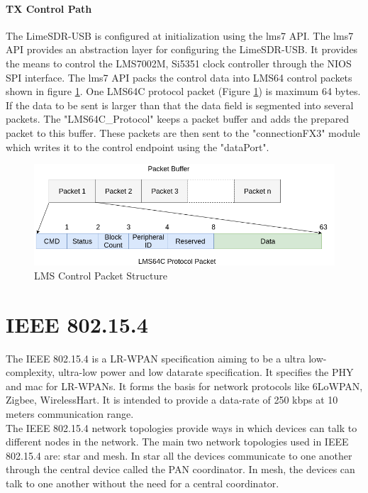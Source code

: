 \paragraph{TX Control Path} The LimeSDR-USB is configured at initialization using the lms7 \ac{API}.
The lms7 \ac{API} provides an abstraction layer for configuring the LimeSDR-USB.
It provides the means to control the LMS7002M, Si5351 clock controller through the NIOS SPI interface.
The lms7 API packs the control data into LMS64 control packets shown in figure \ref{lms_packet}.
One LMS64C protocol packet (Figure \ref{lms_packet}) is maximum 64 bytes.
If the data to be sent is larger than that the data field is segmented into several packets.
The "LMS64C\_Protocol" keeps a packet buffer and adds the prepared packet to this buffer.
These packets are then sent to the "connectionFX3" module which writes it to the control endpoint using the "dataPort".



\begin{figure}[h!]
\centering
\includegraphics[width=\textwidth]{Figure/LMS64C_Packet.png}
\caption{LMS Control Packet Structure}
\label{lms_packet}
\end{figure}

\section{IEEE 802.15.4}
The IEEE 802.15.4 is a \ac{LR-WPAN} specification aiming to be a ultra low-complexity, ultra-low power and low datarate specification.
It specifies the \ac{PHY} and \ac{mac} for \ac{LR-WPAN}s.
It forms the basis for network protocols like \ac{6LoWPAN}, Zigbee, WirelessHart.
It is intended to provide a data-rate of 250 kbps at 10 meters communication range.\\

The IEEE 802.15.4 network topologies provide ways in which devices can talk to different nodes in the network.
The main two network topologies used in IEEE 802.15.4 are: star and mesh.
In star all the devices communicate to one another through the central device called the \ac{PAN} coordinator.
In mesh, the devices can talk to one another without the need for a central coordinator.\\

